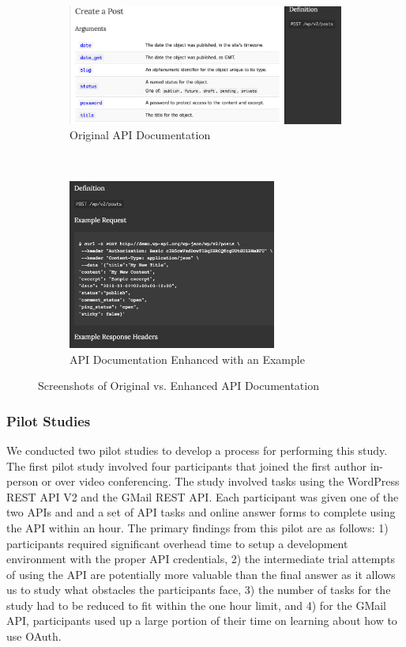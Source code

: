 \documentclass[conference]{IEEEtran}
\begin{document}
\begin{figure}[htp]
\centering

\begin{subfigure}[t]{4in}
\centering
\includegraphics[width=4in]{original.png}
\caption{Original API Documentation}
\label{fig:original}
\end{subfigure}
~
\begin{subfigure}[t]{3in}
\centering
\includegraphics[width=2.7in]{forked.png}
\caption{API Documentation Enhanced with an Example}
\label{fig:enhanced}
\end{subfigure}
\caption{Screenshots of Original vs. Enhanced API Documentation}
\end{figure}


\subsubsection{Pilot Studies}

We conducted two pilot studies to develop a process for performing this study. The first pilot study involved four participants that joined the first author in-person or over video conferencing. The study involved tasks using the WordPress REST API V2 and the GMail REST API. Each participant was given one of the two APIs and and a set of API tasks and online answer forms to complete using the API within an hour. The primary findings from this pilot are as follows: 1) participants required significant overhead time to setup a development environment with the proper API credentials, 2) the intermediate trial attempts of using the API are potentially more valuable than the final answer as it allows us to study what obstacles the participants face, 3) the number of tasks for the study had to be reduced to fit within the one hour limit, and 4) for the GMail API, participants used up a large portion of their time on learning about how to use  OAuth.
\end{document}
